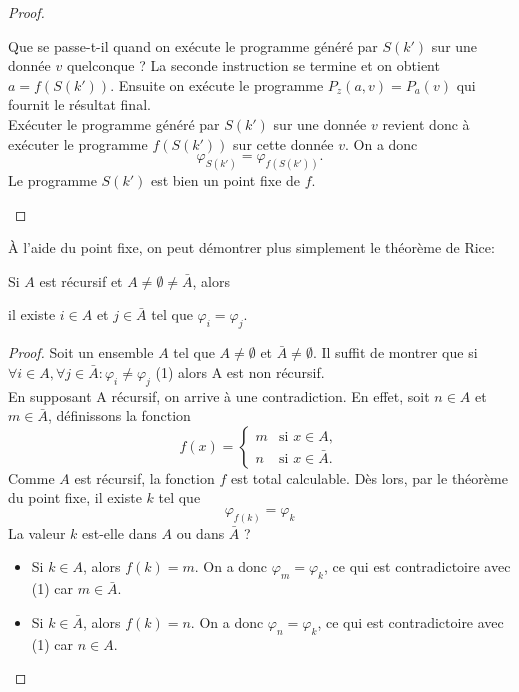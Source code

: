 \begin{proof}
\begin{myrem}
          Que se passe-t-il quand on exécute le programme généré par $S(k')$ sur une donnée $v$ quelconque ?
          La seconde instruction se termine et on obtient $a = f(S(k'))$.
          Ensuite on exécute le programme $P_z(a,v) = P_a(v)$ qui fournit le résultat final. \\
          Exécuter le programme généré par $S(k')$ sur une donnée $v$ revient donc à exécuter le programme $f(S(k'))$ sur cette donnée $v$.
          On a donc
          \[ \varphi_{S(k')} = \varphi_{f(S(k'))}. \]
          Le programme $S(k')$ est bien un point fixe de $f$.
		\end{myrem}
\end{proof}

\begin{myrem}
  À l'aide du point fixe, on peut démontrer plus simplement le théorème de Rice:

  Si $A$ est récursif et $A \neq \emptyset \neq \bar{A}$, alors

  il existe $i \in A$ et $j \in \bar{A}$ tel que $\varphi_i = \varphi_j$.

  \begin{proof}
    Soit un ensemble $A$ tel que $A \neq \emptyset$ et $\bar{A} \neq \emptyset$.  Il suffit de montrer que si
    $\forall i \in A, \forall j \in \bar{A} : \varphi_i \neq \varphi_j$  (1) alors A est non récursif. \\
    En supposant A récursif, on arrive à une contradiction.  En effet,
    soit $n \in A$ et $m \in \bar{A}$, définissons la fonction
    \[
      f(x) =
      \begin{cases}
        m & \text{si }x \in A,\\
        n & \text{si }x \in \bar{A}.
      \end{cases}
    \]
    Comme $A$ est récursif, la fonction $f$ est total calculable.
    Dès lors, par le théorème du point fixe, il existe $k$ tel que
    \[ \varphi_{f(k)} = \varphi_k \]
    La valeur $k$ est-elle dans $A$ ou dans $\bar{A}$ ?
    \begin{itemize}
      \item Si $k \in A$, alors $f(k)=m$.  On a donc $\varphi_m = \varphi_k$, ce qui est contradictoire avec (1) car
       $m \in \bar{A}$.
      \item Si $k \in \bar{A}$, alors $f(k)=n$.  On a donc $\varphi_n = \varphi_k$, ce qui est contradictoire avec (1) car
        $n \in A$.
    \end{itemize}
  \end{proof}
\end{myrem}


